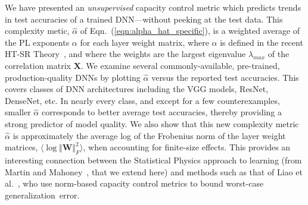 {We have presented an \emph{unsupervised} capacity control metric which predicts trends in test accuracies of a trained DNN---without peeking at the test data. 
This complexity metic, $\hat{\alpha}$ of Eqn.~(\ref{eqn:alpha_hat_specific}), is a weighted average of the PL exponents $\alpha$ for each layer weight matrix, where $\alpha$ is defined in the recent HT-SR Theory~\cite{MM17_TR,MM18_TR}, and where the weights are the largest eigenvalue $\lambda_{max}$ of the correlation matrix $\mathbf{X}$.  
%
We examine several commonly-available, pre-trained, production-quality DNNs by plotting $\hat{\alpha}$ versus the reported test accuracies.
This covers classes of DNN architectures including the VGG models, ResNet, DenseNet, etc. 
In nearly every class, and except for a few counterexamples, smaller $\hat{\alpha}$ corresponds to better average test accuracies, thereby providing a strong predictor of model quality.
%
We also show that this new complexity metric $\hat{\alpha}$ is approximately the average log of the Frobenius norm of the layer weight matrices, $\langle\log\Vert\mathbf{W}\Vert_{F}^{2}\rangle$, when accounting for finite-size effects.
This provides an interesting connection between the Statistical Physics approach to learning (from Martin and Mahoney~\cite{MM17_TR,MM18_TR}, that we extend here) and methods such as that of Liao et al.~\cite{LMBx18_TR}, who use norm-based capacity control metrics to bound worst-case generalization~error.

}
